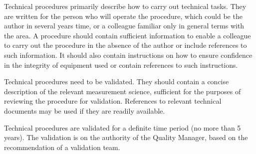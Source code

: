 Technical procedures primarily describe how to carry out technical tasks. They are written for the person who will operate the procedure, which could be the author in several years time, or a colleague familiar only in general terms with the area. A procedure should contain sufficient information to enable a colleague to carry out the procedure in the absence of the author or include references to such information. It should also contain instructions on how to ensure confidence in the integrity of equipment used or contain references to such instructions.

Technical procedures need to be validated. They should contain a concise description of the relevant measurement science, sufficient for the purposes of reviewing the procedure for validation. References to relevant technical documents may be used if they are readily available. 

Technical procedures are validated for a definite time period (no more than 5 years). The validation is on the authority of the Quality Manager, based on the recommendation of a validation team. 

